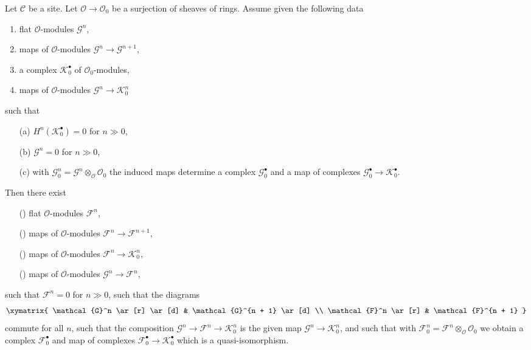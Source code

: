 \begin{lemma}
\label{lemma-lift-complex}
Let $\mathcal{C}$ be a site. Let $\mathcal{O} \to \mathcal{O}_0$
be a surjection of sheaves of rings. Assume given the following data
\begin{enumerate}
\item flat $\mathcal{O}$-modules $\mathcal{G}^n$,
\item maps of $\mathcal{O}$-modules $\mathcal{G}^n \to \mathcal{G}^{n + 1}$,
\item a complex $\mathcal{K}_0^\bullet$ of $\mathcal{O}_0$-modules,
\item maps of $\mathcal{O}$-modules $\mathcal{G}^n \to \mathcal{K}_0^n$
\end{enumerate}
such that
\begin{enumerate}
\item[(a)] $H^n(\mathcal{K}_0^\bullet) = 0$ for $n \gg 0$,
\item[(b)] $\mathcal{G}^n = 0$ for $n \gg 0$,
\item[(c)] with
$\mathcal{G}^n_0 = \mathcal{G}^n \otimes_\mathcal{O} \mathcal{O}_0$
the induced maps determine a complex $\mathcal{G}_0^\bullet$ and a map
of complexes $\mathcal{G}_0^\bullet \to \mathcal{K}_0^\bullet$.
\end{enumerate}
Then there exist
\begin{enumerate}
\item[(\romannumeral1)]
flat $\mathcal{O}$-modules $\mathcal{F}^n$,
\item[(\romannumeral2)]
maps of $\mathcal{O}$-modules $\mathcal{F}^n \to \mathcal{F}^{n + 1}$,
\item[(\romannumeral3)]
maps of $\mathcal{O}$-modules $\mathcal{F}^n \to \mathcal{K}_0^n$,
\item[(\romannumeral4)]
maps of $\mathcal{O}$-modules $\mathcal{G}^n \to \mathcal{F}^n$,
\end{enumerate}
such that $\mathcal{F}^n = 0$ for $n \gg 0$, such that the diagrams
$$
\xymatrix{
\mathcal{G}^n \ar[r] \ar[d] & \mathcal{G}^{n + 1} \ar[d] \\
\mathcal{F}^n \ar[r] & \mathcal{F}^{n + 1}
}
$$
commute for all $n$, such that the composition
$\mathcal{G}^n \to \mathcal{F}^n \to \mathcal{K}_0^n$
is the given map $\mathcal{G}^n \to \mathcal{K}_0^n$, and such that with
$\mathcal{F}^n_0 = \mathcal{F}^n \otimes_\mathcal{O} \mathcal{O}_0$
we obtain a complex $\mathcal{F}_0^\bullet$ and map of complexes
$\mathcal{F}_0^\bullet \to \mathcal{K}_0^\bullet$ which is a
quasi-isomorphism.
\end{lemma}

